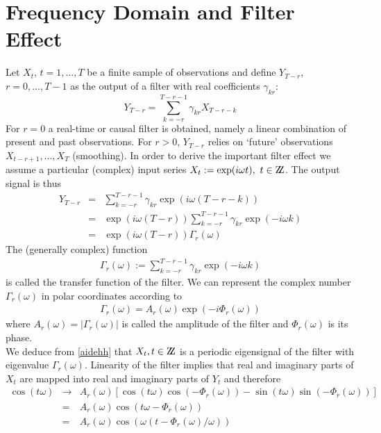\documentclass[11pt]{article}
\begin{document}
\section{Frequency Domain and Filter Effect}\label{fe}

Let $X_t$, $t=1,...,T$ be a finite sample of observations and define $Y_{T-r}$, $r=0,...,T-1$ as the output of a filter with real coefficients $\gamma_{kr}$:
\[Y_{T-r}=\sum_{k=-r}^{T-r-1}\gamma_{kr} X_{T-r-k}\]
For $r=0$ a real-time or causal filter is obtained, namely a linear combination of present and past observations. For $r>0$, $Y_{T-r}$ relies on `future' observations $X_{t-r+1},...,X_T$ (smoothing). In order to derive the important filter effect we assume a particular (complex) input series \(X_t:=\exp(i\omega t),~t\in \mbox{Z\hspace{-.3em}Z}\).
The output signal is thus
\begin{eqnarray}\label{aidehh}
Y_{T-r}&=&\sum_{k=-r}^{T-r-1}{\gamma}_{kr}\exp(i\omega(T-r-k))\\
&=&\exp(i\omega (T-r))\sum_{k=-r}^{T-r-1}{\gamma}_{kr}\exp(-i\omega
k)\\
&=&\exp(i\omega (T-r)){\Gamma}_r(\omega)
\end{eqnarray}
The (generally complex) function
\begin{eqnarray}
\Gamma_r(\omega):=\sum_{k=-r}^{T-r-1}{\gamma}_{kr}\exp(-i\omega
k)
\end{eqnarray}
is called the transfer function of the filter. We can represent the complex number $\Gamma_r(\omega)$ in polar coordinates according to
\begin{eqnarray}
\Gamma_r(\omega)=A_r(\omega)\exp(-i\Phi_r(\omega))
\end{eqnarray}
where $A_r(\omega)=|\Gamma_r(\omega)|$ is called the amplitude of the filter and $\Phi_r(\omega)$ is its phase. \\
We deduce from \ref{aidehh} that
\(X_t,t\in \mbox{Z\hspace{-.3em}Z}\) is a periodic {eigensignal} of
the filter with eigenvalue \({\Gamma}_r(\omega)\). Linearity of the filter implies that real and imaginary parts of $X_t$ are mapped into real and imaginary parts of $Y_{t}$ and therefore
\begin{eqnarray}
\cos(t\omega)&\to& A_r(\omega)\left[
\cos(t\omega)\cos(-{\Phi}_r(\omega))-\sin(t\omega)
\sin(-{\Phi}_r(\omega))\right]\nonumber\\
&=&A_r(\omega)\cos(t\omega-{\Phi}_r(\omega))\nonumber\\
&=&A_r(\omega) \cos(\omega(t-{\Phi}_r(\omega)/\omega)) \label{costocosphi}
\end{eqnarray}
\end{document}
